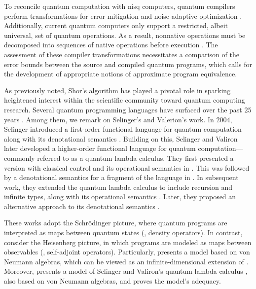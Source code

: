 To reconcile quantum computation with \acrshort{nisq} computers, quantum compilers perform transformations for error mitigation \cite{wallman2016noise} and noise-adaptive optimization \cite{murali2019noise}. Additionally, current quantum computers only support a restricted, albeit universal, set of quantum operations. As a result, nonnative operations must be decomposed into sequences of native operations before execution \cite{harrow2002efficient,burgholzer2020advanced}. The assessment of these compiler transformations necessitates a comparison of the error bounds between the source and compiled quantum programs, which calls  for the development of appropriate notions of approximate program equivalence.


As previously noted, Shor's algorithm has played a pivotal role in sparking heightened interest within the scientific community toward quantum computing research. Several quantum programming languages have surfaced over the past 25 years \cite{zhao2020quantum,serrano2022quantum}. Among them, we remark on Selinger's and Valerion's work. In 2004, Selinger introduced a first-order functional language for quantum computation along with its denotational semantics \cite{selinger2004towards}. Building on this, Selinger and Valiron later developed a higher-order functional language for quantum computation—commonly referred to as a quantum lambda calculus. They first presented a version with classical control and its operational semantics in \cite{selinger2006lambda}. This was followed by a denotational semantics for a fragment of the language in \cite{selinger2008fully}. In subsequent work, they extended the quantum lambda calculus to include recursion and infinite types, along with its operational semantics \cite{selinger2009quantum}. Later, they proposed an alternative approach to its denotational semantics \cite{selinger2014}.


These works adopt the Schr\"odinger picture, where quantum programs are interpreted as maps between quantum states (\ie, density operators). In contrast, \cite{choSemanticsQuantumProgramming2016, choNeumannAlgebrasForm2016} consider the Heisenberg picture, in which programs are modeled as maps between observables (\ie, self-adjoint operators). Particularly, \cite{choSemanticsQuantumProgramming2016} presents a model based on von Neumann algebras, which can be viewed as an infinite-dimensional extension of \cite{selinger2004towards}. Moreover, \cite{choSemanticsQuantumProgramming2016} presents a model of Selinger and Valiron’s quantum lambda calculus \cite{selinger2006lambda, selinger2008linear, selinger2009quantum}, also based on von Neumann algebras, and proves the model's adequacy.


